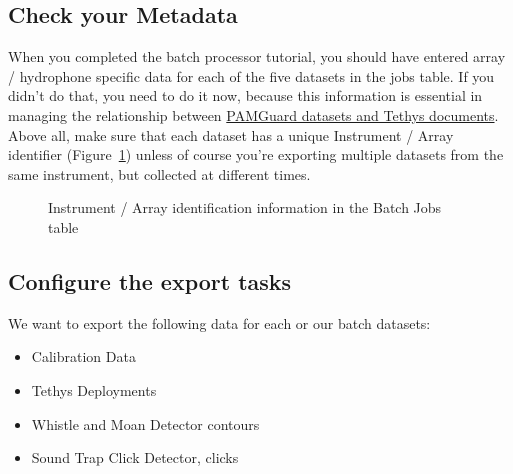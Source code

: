 \documentclass[
]{article}
\providecommand{\tightlist}{%
  \setlength{\itemsep}{0pt}\setlength{\parskip}{0pt}}\usepackage{longtable,booktabs,array}
\begin{document}
\subsection{Check your Metadata}\label{check-your-metadata}

When you completed the batch processor tutorial, you should have entered
array / hydrophone specific data for each of the five datasets in the
jobs table. If you didn't do that, you need to do it now, because this
information is essential in managing the relationship between
\href{https://www.pamguard.org/olhelp/utilities/tethys/docs/tethys_mappings.html}{PAMGuard
datasets and Tethys documents}. Above all, make sure that each dataset
has a unique Instrument / Array identifier (Figure~\ref{fig-instid})
unless of course you're exporting multiple datasets from the same
instrument, but collected at different times.

\begin{figure}


\caption{\label{fig-instid}Instrument / Array identification information
in the Batch Jobs table}

\end{figure}%

\subsection{Configure the export
tasks}\label{configure-the-export-tasks}

We want to export the following data for each or our batch datasets:

\begin{itemize}
\tightlist
\item
  Calibration Data
\item
  Tethys Deployments
\item
  Whistle and Moan Detector contours
\item
  Sound Trap Click Detector, clicks
\end{itemize}
\end{document}
